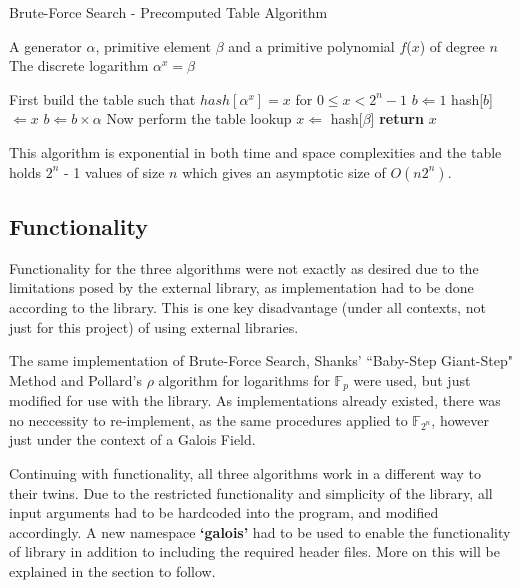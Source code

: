 \documentclass[iwp,first]{luthesis}
\begin{document}
\begin{algorithm}
\caption{Brute-Force Search - Precomputed Table Algorithm}
\begin{algorithmic}
\REQUIRE A generator $\alpha$, primitive element $\beta$ and a primitive polynomial $f$($x$)     \STATE	           of degree $n$
\ENSURE The discrete logarithm $\alpha^x = \beta$
\begin{enumerate}
\STATE First build the table such that $hash[\alpha^x] = x$ for $0 \leq x < 2^{n} - 1$ 
\STATE $b \Leftarrow 1$
\STATE hash[$b$] $\Leftarrow x$
\STATE $b \Leftarrow b \times \alpha$
\ENDFOR
\STATE Now perform the table lookup
\STATE $x \Leftarrow$ hash[$\beta$]
\STATE \textbf{return} $x$
\end{enumerate}
\end{algorithmic}
\end{algorithm}


This algorithm is exponential in both time and space complexities and the table holds $2^{n}$ - 1 values of size $n$ which gives an asymptotic size of $O(n2^{n})$.



\subsection{Functionality}

Functionality for the three algorithms were not exactly as desired due to the limitations posed by the external library, as implementation had to be done according to the library. This is one key disadvantage (under all contexts, not just for this project) of using external libraries. 

The same implementation of Brute-Force Search, Shanks' ``Baby-Step Giant-Step" Method and Pollard's $\rho$ algorithm for logarithms for $\mathbb{F}_p$ were used, but just modified for use with the library. As implementations already existed, there was no neccessity to re-implement, as the same procedures applied to $\mathbb{F}_{2^n}$, however just under the context of a Galois Field. 

Continuing with functionality, all three algorithms work in a different way to their twins. Due to the restricted functionality and simplicity of the library, all input arguments had to be hardcoded into the program, and modified accordingly. A new namespace \textbf{`galois'} had to be used to enable the functionality of library in addition to including the required header files. More on this will be explained in the section to follow.
\end{document}
